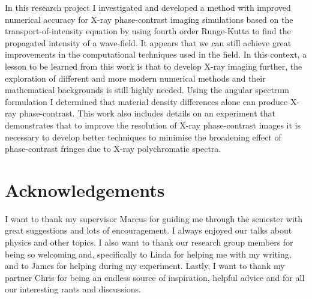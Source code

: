 \documentclass[10pt, a4paper, singlespacing]{report}
\begin{document}
In this research project I investigated and developed a method with improved numerical accuracy for X-ray phase-contrast imaging simulations based on the transport-of-intensity equation by using fourth order Runge-Kutta to find the propagated intensity of a wave-field. It appears that we can still achieve great improvements in the computational techniques used in the field. In this context, a lesson to be learned from this work is that to develop X-ray imaging further, the exploration of different and more modern numerical methods and their mathematical backgrounds is still highly needed.
Using the angular spectrum formulation I determined that material density differences alone can produce X-ray phase-contrast.  This work also includes details on an experiment that demonstrates that to improve the resolution of X-ray phase-contrast images it is necessary to develop better techniques to minimise the broadening effect of phase-contrast fringes due to X-ray polychromatic spectra. 


\chapter{Acknowledgements}\label{Acknowledgements}

I want to thank my supervisor Marcus for guiding me through the semester with great suggestions and lots of encouragement. I always enjoyed our talks about physics and other topics. I also want to thank our research group members for being so welcoming and, specifically to Linda for helping me with my writing, and to James for helping during my experiment. Lastly, I want to thank my partner Chris for being an endless source of inspiration, helpful advice and for all our interesting rants and discussions.  

\end{document}
